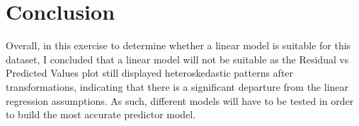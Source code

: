 \documentclass{article}
\begin{document}
\section*{Conclusion}

Overall, in this exercise to determine whether a linear model is suitable for this dataset, I concluded that a linear model will not be suitable as the Residual vs Predicted Values plot still displayed heteroskedastic patterns after transformations, indicating that there is a significant departure from the linear regression assumptions. As such, different models will have to be tested in order to build the most accurate predictor model.
\end{document}
